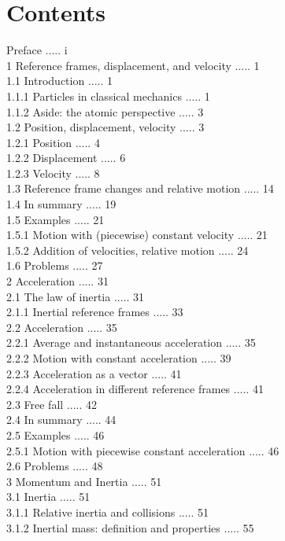 \documentclass[10pt]{article}
\begin{document}
\section*{Contents}
Preface ..... i\\
1 Reference frames, displacement, and velocity ..... 1\\
1.1 Introduction ..... 1\\
1.1.1 Particles in classical mechanics ..... 1\\
1.1.2 Aside: the atomic perspective ..... 3\\
1.2 Position, displacement, velocity ..... 3\\
1.2.1 Position ..... 4\\
1.2.2 Displacement ..... 6\\
1.2.3 Velocity ..... 8\\
1.3 Reference frame changes and relative motion ..... 14\\
1.4 In summary ..... 19\\
1.5 Examples ..... 21\\
1.5.1 Motion with (piecewise) constant velocity ..... 21\\
1.5.2 Addition of velocities, relative motion ..... 24\\
1.6 Problems ..... 27\\
2 Acceleration ..... 31\\
2.1 The law of inertia ..... 31\\
2.1.1 Inertial reference frames ..... 33\\
2.2 Acceleration ..... 35\\
2.2.1 Average and instantaneous acceleration ..... 35\\
2.2.2 Motion with constant acceleration ..... 39\\
2.2.3 Acceleration as a vector ..... 41\\
2.2.4 Acceleration in different reference frames ..... 41\\
2.3 Free fall ..... 42\\
2.4 In summary ..... 44\\
2.5 Examples ..... 46\\
2.5.1 Motion with piecewise constant acceleration ..... 46\\
2.6 Problems ..... 48\\
3 Momentum and Inertia ..... 51\\
3.1 Inertia ..... 51\\
3.1.1 Relative inertia and collisions ..... 51\\
3.1.2 Inertial mass: definition and properties ..... 55\\
\end{document}
